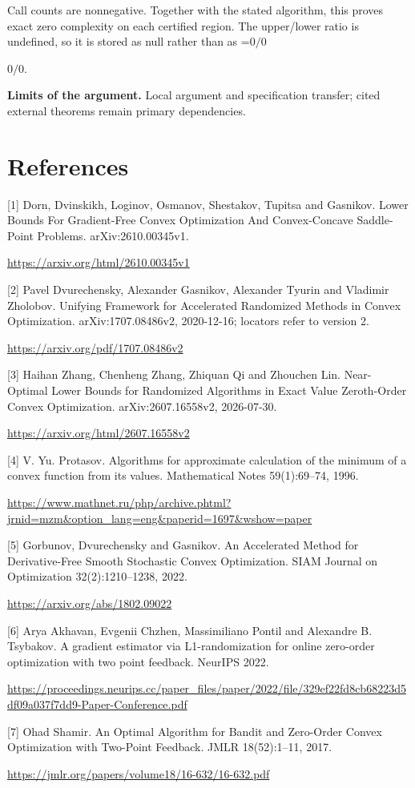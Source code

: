 \documentclass[10pt,a4paper]{article}
\newcommand{\AtlasMath}[1]{\par\begingroup\centering\setbox0=\hbox{$\displaystyle #1$}\ifdim\wd0>1.4\linewidth\typeout{ATLAS WIDE FORMULA: \the\wd0}\fi\ifdim\wd0>\linewidth\resizebox{\linewidth}{!}{\box0}\else\box0\fi\par\endgroup}
\newcommand{\AtlasInlineMath}[1]{\begingroup\setbox0=\hbox{$#1$}\ifdim\wd0>.4\linewidth\endgroup\AtlasMath{#1}\else\endgroup$#1$\fi}
\begin{document}
Call counts are nonnegative. Together with the stated algorithm, this proves exact zero complexity on each certified region. The upper/lower ratio is undefined, so it is stored as null rather than as \AtlasInlineMath{0/0}.

\textbf{Limits of the argument.} Local argument and specification transfer; cited external theorems remain primary dependencies.

\section{References}
[1] Dorn, Dvinskikh, Loginov, Osmanov, Shestakov, Tupitsa and Gasnikov. Lower Bounds For Gradient-Free Convex Optimization And Convex-Concave Saddle-Point Problems. arXiv:2610.00345v1.

\url{https://arxiv.org/html/2610.00345v1}

[2] Pavel Dvurechensky, Alexander Gasnikov, Alexander Tyurin and Vladimir Zholobov. Unifying Framework for Accelerated Randomized Methods in Convex Optimization. arXiv:1707.08486v2, 2020-12-16; locators refer to version 2.

\url{https://arxiv.org/pdf/1707.08486v2}

[3] Haihan Zhang, Chenheng Zhang, Zhiquan Qi and Zhouchen Lin. Near-Optimal Lower Bounds for Randomized Algorithms in Exact Value Zeroth-Order Convex Optimization. arXiv:2607.16558v2, 2026-07-30.

\url{https://arxiv.org/html/2607.16558v2}

[4] V. Yu. Protasov. Algorithms for approximate calculation of the minimum of a convex function from its values. Mathematical Notes 59(1):69--74, 1996.

\url{https://www.mathnet.ru/php/archive.phtml?jrnid=mzm&option_lang=eng&paperid=1697&wshow=paper}

[5] Gorbunov, Dvurechensky and Gasnikov. An Accelerated Method for Derivative-Free Smooth Stochastic Convex Optimization. SIAM Journal on Optimization 32(2):1210--1238, 2022.

\url{https://arxiv.org/abs/1802.09022}

[6] Arya Akhavan, Evgenii Chzhen, Massimiliano Pontil and Alexandre B. Tsybakov. A gradient estimator via L1-randomization for online zero-order optimization with two point feedback. NeurIPS 2022.

\url{https://proceedings.neurips.cc/paper_files/paper/2022/file/329ef22fd8cb68223d5df09a037f7dd9-Paper-Conference.pdf}

[7] Ohad Shamir. An Optimal Algorithm for Bandit and Zero-Order Convex Optimization with Two-Point Feedback. JMLR 18(52):1--11, 2017.

\url{https://jmlr.org/papers/volume18/16-632/16-632.pdf}
\end{document}
